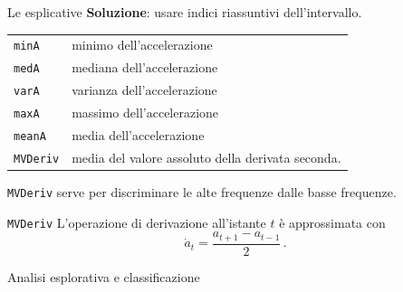 \documentclass{beamer}
\newcommand{\separator}[1]{
\begin{frame}[sep]
\centering
\vspace*{\fill}
{\color{white}\huge #1}
\vspace*{\fill}
\end{frame}
}
\begin{document}
\begin{frame}{Le esplicative}
\textbf{Soluzione}: usare indici riassuntivi dell'intervallo.
\begin{table}[H]
	\centering
	\begin{tabular}{ll}
		\texttt{minA}& minimo dell'accelerazione\\
		\texttt{medA}& mediana dell'accelerazione\\
		\texttt{varA}& varianza dell'accelerazione\\
		\texttt{maxA}& massimo dell'accelerazione\\
		\texttt{meanA}& media dell'accelerazione\\
		\texttt{MVDeriv}& media del valore assoluto della derivata seconda.
	\end{tabular}
\end{table}
\pause
\texttt{MVDeriv} serve per discriminare le alte frequenze dalle basse frequenze.\\
\end{frame}

\begin{frame}{\texttt{MVDeriv}}
\bigskip
L'operazione di derivazione all'istante $t$ è approssimata con\cite{NumpyGradientNumPy}
\[
\dot{a}_t = \dfrac{a_{t + 1} - a_{t - 1}}{2}\,.
\]
\end{frame}

\separator{Analisi esplorativa e classificazione}
\end{document}
